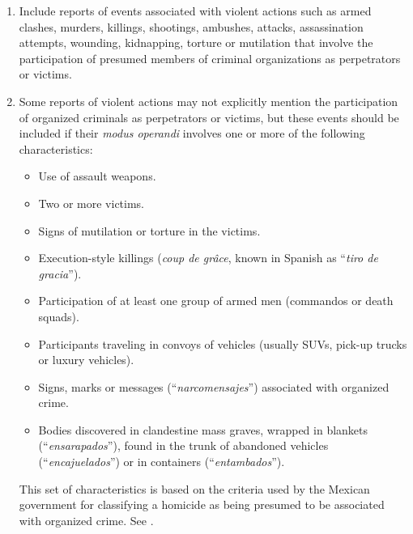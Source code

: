 \documentclass[12pt,letterpaper]{article}
\begin{document}
\begin{enumerate} %
    \item Include reports of events associated with violent actions such as armed clashes, murders, killings, shootings, ambushes, attacks, assassination attempts, wounding, kidnapping, torture or mutilation that involve the participation of presumed members of criminal organizations as perpetrators or victims.
    \item Some reports of violent actions may not explicitly mention the participation of organized criminals as perpetrators or victims, but these events should be included if their \emph{modus operandi} involves one or more of the following characteristics: 
        \begin{itemize} %
        \item Use of assault weapons.
        \item Two or more victims.
        \item Signs of mutilation or torture in the victims.
        \item Execution-style killings (\emph{coup de gr\^{a}ce}, known in Spanish as ``\emph{tiro de gracia}'').
        \item Participation of at least one group of armed men (commandos or death squads).
        \item Participants traveling in convoys of vehicles (usually SUVs, pick-up trucks or luxury vehicles).
        \item Signs, marks or messages (``\emph{narcomensajes}'') associated with organized crime.
        \item Bodies discovered in clandestine mass graves, wrapped in blankets (``\emph{ensarapados}''), found in the trunk of abandoned vehicles (``\emph{encajuelados}'') or in containers (``\emph{entambados}'').
        \end{itemize}
    
    This set of characteristics is based on the criteria used by the Mexican government for classifying a homicide as being presumed to be associated with organized crime. See \citet{SistemaNacionaldeSeguridadPublica2011}.
        

\end{enumerate}
\end{document}
